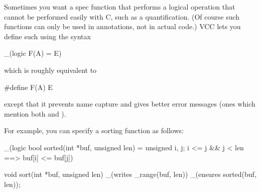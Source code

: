 Sometimes you want a spec function that performs a logical operation
that cannot be performed easily with C, such as a quantification. (Of
course such functions can only be used in annotations, not in actual
code.) VCC lets you define such  using the syntax

\begin{VCC}
_(logic F(A) = E)
\end{VCC}
which is roughly equivalent to 
\begin{VCC}
#define F(A) E
\end{VCC}
except that it prevents
name capture and gives better error messages (\ie ones which mention
both  and ). 
 
For example, you can specify a sorting function as follows:
\begin{VCC}
_(logic bool sorted(int *buf, unsigned len) =
  \forall unsigned i, j; i <= j && j < len ==> buf[i] <= buf[j])

void sort(int *buf, unsigned len)
  _(writes \array_range(buf, len))
  _(ensures sorted(buf, len));
\end{VCC}








